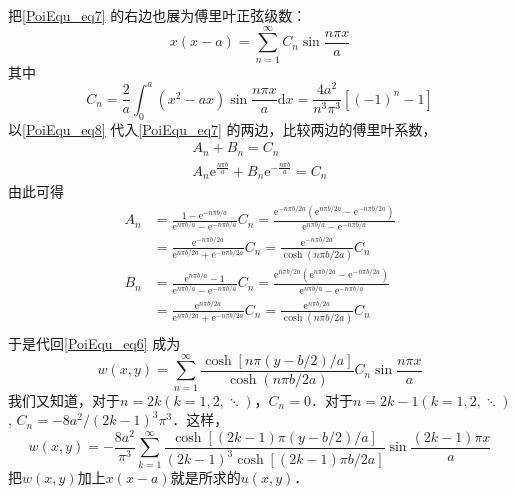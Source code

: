 \begin{example}{}
\begin{equation}
    \end{equation}
    把\autoref{PoiEqu_eq7} 的右边也展为傅里叶正弦级数：
    \begin{equation} \label{PoiEqu_eq8}
        x(x-a)=\sum_{n=1}^{\infty} C_{n} \sin \frac{n \pi x}{a}
    \end{equation}
    其中
    \begin{equation}
        C_{n}=\frac{2}{a} \int_{0}^{a}\left(x^{2}-a x\right) \sin \frac{n \pi x}{a} \mathrm{d} x=\frac{4 a^{2}}{n^{3} \pi^{3}}\left[(-1)^{n}-1\right]
    \end{equation}
    以\autoref{PoiEqu_eq8} 代入\autoref{PoiEqu_eq7} 的两边，比较两边的傅里叶系数，
    \begin{equation}
        \begin{array}{c}A_{n}+B_{n}=C_{n} \\ A_{n} \mathrm{e}^{\frac{n \pi b}{a}}+B_{n} \mathrm{e}^{-\frac{n \pi b}{a}}=C_{n}\end{array}
    \end{equation}
    由此可得
    \begin{equation}
        \begin{aligned}
            A_n&=\frac{1-\text{e}^{-n\pi b/a}}{\text{e}^{n\pi b/a}-\text{e}^{-n\pi b/a}}C_n=\frac{\text{e}^{-n\pi b/2a}\left( \text{e}^{n\pi b/2a}-\text{e}^{-n\pi b/2a} \right)}{\text{e}^{n\pi b/a}-\text{e}^{-n\pi b/a}}\\
            &=\frac{\text{e}^{-n\pi b/2a}}{\text{e}^{n\pi b/2a}+\text{e}^{-n\pi b/2a}}C_n=\frac{\text{e}^{-n\pi b/2a}}{\cosh \left( n\pi b/2a \right)}C_n\\
            B_n&=\frac{\text{e}^{n\pi b/a}-1}{\text{e}^{n\pi b/a}-\text{e}^{-n\pi b/a}}C_n=\frac{\text{e}^{n\pi b/2a}\left( \text{e}^{n\pi b/2a}-\text{e}^{-n\pi b/2a} \right)}{\text{e}^{n\pi b/a}-\text{e}^{-n\pi b/a}}\\
            &=\frac{\text{e}^{n\pi b/2a}}{\text{e}^{n\pi b/2a}+\text{e}^{-n\pi b/2a}}C_n=\frac{\text{e}^{n\pi b/2a}}{\cosh \left( n\pi b/2a \right)}C_n\\
        \end{aligned}
    \end{equation}
    于是代回\autoref{PoiEqu_eq6} 成为
    \begin{equation}
        w(x, y)=\sum_{n=1}^{\infty} \frac{\cosh [n \pi(y-b / 2) / a]}{\cosh (n \pi b / 2 a)} C_{n} \sin \frac{n \pi x}{a}
    \end{equation}
    我们又知道，对于$n=2k(k=1,2,\ddots)$，$C_n=0$．对于$n=2k-1(k=1,2,\ddots)$, $C_n=-8a^2/(2k-1)^3\pi^3$．这样，
    \begin{equation}
        w(x, y)=-\frac{8 a^{2}}{\pi^{3}} \sum_{k=1}^{\infty} \frac{\cosh [(2 k-1) \pi(y-b / 2) / a]}{(2 k-1)^{3} \cosh [(2 k-1) \pi b / 2 a]} \sin \frac{(2 k-1) \pi x}{a}
    \end{equation}
    把$w(x,y)$加上$x(x-a)$就是所求的$u(x,y)$．
\end{example}

